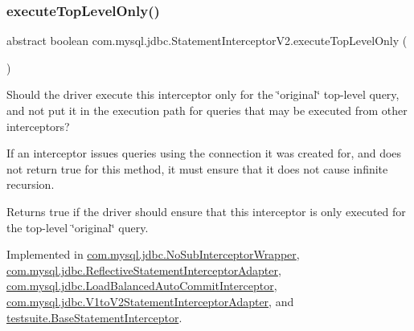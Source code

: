 \subsubsection{\texorpdfstring{execute\+Top\+Level\+Only()}{executeTopLevelOnly()}}
{\footnotesize\ttfamily abstract boolean com.\+mysql.\+jdbc.\+Statement\+Interceptor\+V2.\+execute\+Top\+Level\+Only (\begin{DoxyParamCaption}{ }\end{DoxyParamCaption})\hspace{0.3cm}{\ttfamily [abstract]}}

Should the driver execute this interceptor only for the \char`\"{}original\char`\"{} top-\/level query, and not put it in the execution path for queries that may be executed from other interceptors?

If an interceptor issues queries using the connection it was created for, and does not return {\ttfamily true} for this method, it must ensure that it does not cause infinite recursion.

\begin{DoxyReturn}{Returns}
true if the driver should ensure that this interceptor is only executed for the top-\/level \char`\"{}original\char`\"{} query. 
\end{DoxyReturn}


Implemented in \mbox{\hyperlink{classcom_1_1mysql_1_1jdbc_1_1_no_sub_interceptor_wrapper_a3688c515a37ae2f36b8f59ae51304ac4}{com.\+mysql.\+jdbc.\+No\+Sub\+Interceptor\+Wrapper}}, \mbox{\hyperlink{classcom_1_1mysql_1_1jdbc_1_1_reflective_statement_interceptor_adapter_abe31396aeda856d1ef66a90f95b3d3c0}{com.\+mysql.\+jdbc.\+Reflective\+Statement\+Interceptor\+Adapter}}, \mbox{\hyperlink{classcom_1_1mysql_1_1jdbc_1_1_load_balanced_auto_commit_interceptor_afdb08603f13610a4d26d188bf171c232}{com.\+mysql.\+jdbc.\+Load\+Balanced\+Auto\+Commit\+Interceptor}}, \mbox{\hyperlink{classcom_1_1mysql_1_1jdbc_1_1_v1to_v2_statement_interceptor_adapter_aa5c3d7a91f90891f02b1a33310e4efb6}{com.\+mysql.\+jdbc.\+V1to\+V2\+Statement\+Interceptor\+Adapter}}, and \mbox{\hyperlink{classtestsuite_1_1_base_statement_interceptor_a1eb3615bcd122817ef160af0a06d7e23}{testsuite.\+Base\+Statement\+Interceptor}}.

